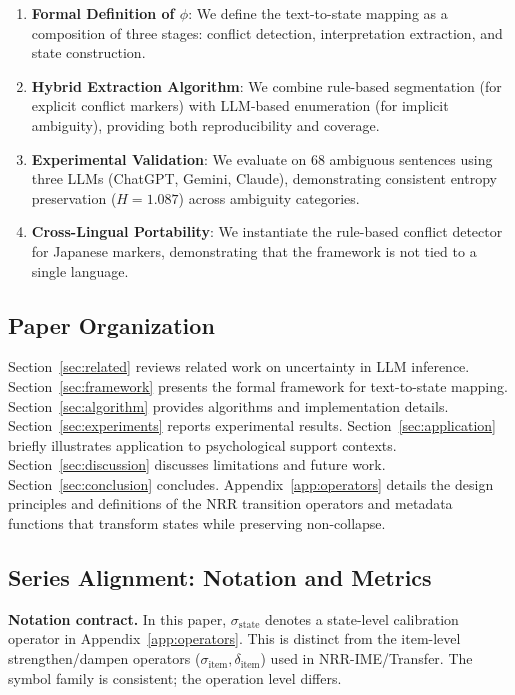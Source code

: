 \documentclass[11pt,a4paper]{article}
\begin{document}
\begin{enumerate}
    \item \textbf{Formal Definition of $\phi$}: We define the text-to-state mapping as a 
          composition of three stages: conflict detection, interpretation extraction, 
          and state construction.
    
    \item \textbf{Hybrid Extraction Algorithm}: We combine rule-based segmentation 
          (for explicit conflict markers) with LLM-based enumeration (for implicit 
          ambiguity), providing both reproducibility and coverage.
    
    \item \textbf{Experimental Validation}: We evaluate on 68 ambiguous sentences 
          using three LLMs (ChatGPT, Gemini, Claude), demonstrating consistent entropy 
          preservation ($H = 1.087$) across ambiguity categories.
    
    \item \textbf{Cross-Lingual Portability}: We instantiate the rule-based conflict 
          detector for Japanese markers, demonstrating that the framework is not 
          tied to a single language.
\end{enumerate}

\subsection{Paper Organization}

Section~\ref{sec:related} reviews related work on uncertainty in LLM inference. 
Section~\ref{sec:framework} presents the formal framework for text-to-state mapping. 
Section~\ref{sec:algorithm} provides algorithms and implementation details. 
Section~\ref{sec:experiments} reports experimental results. 
Section~\ref{sec:application} briefly illustrates application to psychological support contexts. 
Section~\ref{sec:discussion} discusses limitations and future work. 
Section~\ref{sec:conclusion} concludes. 
Appendix~\ref{app:operators} details the design principles and definitions of 
the NRR transition operators and metadata functions that transform states while preserving non-collapse.

\subsection{Series Alignment: Notation and Metrics}

\textbf{Notation contract.} In this paper, $\sigma_{\mathrm{state}}$ denotes a
state-level calibration operator in Appendix~\ref{app:operators}. This is
distinct from the item-level strengthen/dampen operators
($\sigma_{\text{item}}, \delta_{\text{item}}$) used in NRR-IME/Transfer.
The symbol family is consistent; the operation level differs.
\end{document}
